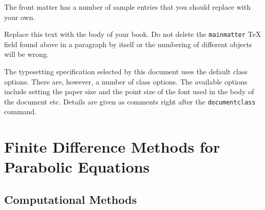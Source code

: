 \documentclass{amsbook}%
\theoremstyle{plain}
\numberwithin{equation}{section}
\begin{document}
The front matter has a number of sample entries that you should
replace with your own.

Replace this text with the body of your book. Do not delete the
\verb|mainmatter| TeX field found above in a paragraph by itself
or the numbering of different objects will be wrong.

The typesetting specification selected by this document uses the
default class options. There are, however, a number of class
options. The available options include setting the paper size and
the point size of the font used in the body of the document etc.
Details are given as comments right after the \verb|documentclass|
command.

\chapter{Finite Difference Methods for Parabolic Equations}

	\section{Computational Methods}
	
\end{document}
